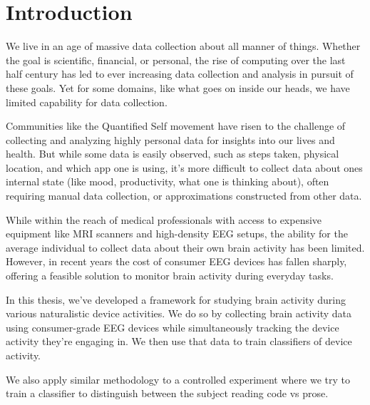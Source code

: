 \chapter{Introduction}



We live in an age of massive data collection about all manner of things. Whether the goal is scientific, financial, or personal, the rise of computing over the last half century has led to ever increasing data collection and analysis in pursuit of these goals. Yet for some domains, like what goes on inside our heads, we have limited capability for data collection.

Communities like the Quantified Self movement have risen to the challenge of collecting and analyzing highly personal data for insights into our lives and health. But while some data is easily observed, such as steps taken, physical location, and which app one is using, it's more difficult to collect data about ones internal state (like mood, productivity, what one is thinking about), often requiring manual data collection, or approximations constructed from other data.



While within the reach of medical professionals with access to expensive equipment like MRI scanners and high-density EEG setups, the ability for the average individual to collect data about their own brain activity has been limited. However, in recent years the cost of consumer EEG devices has fallen sharply, offering a feasible solution to monitor brain activity during everyday tasks.



In this thesis, we've developed a framework for studying brain activity during various naturalistic device activities. We do so by collecting brain activity data using consumer-grade EEG devices while simultaneously tracking the device activity they're engaging in. We then use that data to train classifiers of device activity.

We also apply similar methodology to a controlled experiment where we try to train a classifier to distinguish between the subject reading code vs prose.
